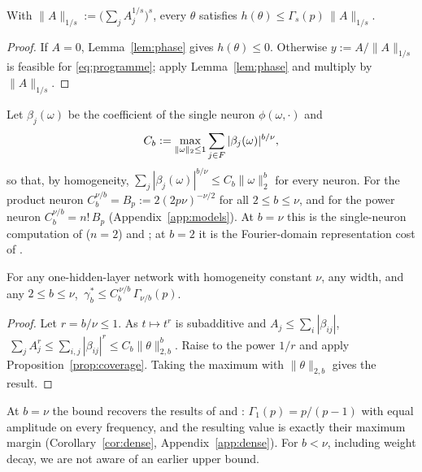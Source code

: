 \begin{proposition}\label{prop:coverage}
With $\|A\|_{1/s}:=\big(\sum_jA_j^{1/s}\big)^s$, every $\theta$ satisfies $h(\theta)\le\Gamma_s(p)\,\|A\|_{1/s}$.
\end{proposition}
\begin{proof}
If $A=0$, Lemma~\ref{lem:phase} gives $h(\theta)\le0$. Otherwise $y:=A/\|A\|_{1/s}$ is feasible for \eqref{eq:programme}; apply Lemma~\ref{lem:phase} and multiply by $\|A\|_{1/s}$.
\end{proof}

Let $\beta_j(\omega)$ be the coefficient of the single neuron $\phi(\omega,\cdot)$ and
\[
C_b:=\max_{\|\omega\|_2\le1}\sum_{j\in F}|\beta_j(\omega)|^{b/\nu},
\]
so that, by homogeneity, $\sum_j|\beta_j(\omega)|^{b/\nu}\le C_b\|\omega\|_2^b$ for every neuron. For the product neuron $C_b^{\nu/b}=B_p:=2(2p\nu)^{-\nu/2}$ for all $2\le b\le\nu$, and for the power neuron $C_b^{\nu/b}=n!\,B_p$ (Appendix~\ref{app:models}). At $b=\nu$ this is the single-neuron computation of \citet[App.~F.1]{morwani2024feature} ($n=2$) and \citet[Lemmas~D.7--D.8]{li2025nsum}; at $b=2$ it is the Fourier-domain representation cost of \citet[Lemma~7]{gunasekar2018implicit}.

\begin{theorem}\label{thm:universal}
For any one-hidden-layer network with homogeneity constant $\nu$, any width, and any $2\le b\le\nu$, $\ \gamma^*_b\le C_b^{\,\nu/b}\,\Gamma_{\nu/b}(p)$.
\end{theorem}
\begin{proof}
Let $r=b/\nu\le1$. As $t\mapsto t^r$ is subadditive and $A_j\le\sum_i|\beta_{ij}|$, $\ \sum_jA_j^r\le\sum_{i,j}|\beta_{ij}|^r\le C_b\|\theta\|_{2,b}^b$. Raise to the power $1/r$ and apply Proposition~\ref{prop:coverage}. Taking the maximum with $\|\theta\|_{2,b}$ gives the result.
\end{proof}

At $b=\nu$ the bound recovers the results of \citet[Thm.~7]{morwani2024feature} and \citet[Thm.~4.1]{li2025nsum}: $\Gamma_1(p)=p/(p-1)$ with equal amplitude on every frequency, and the resulting value is exactly their maximum margin (Corollary~\ref{cor:dense}, Appendix~\ref{app:dense}). For $b<\nu$, including weight decay, we are not aware of an earlier upper bound. 